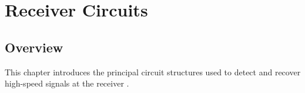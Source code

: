 \chapter{Receiver Circuits}

\section{Overview}

This chapter introduces the principal circuit structures used
to detect and recover high-speed signals at the receiver
\citep{palermo2025ecen720}.





